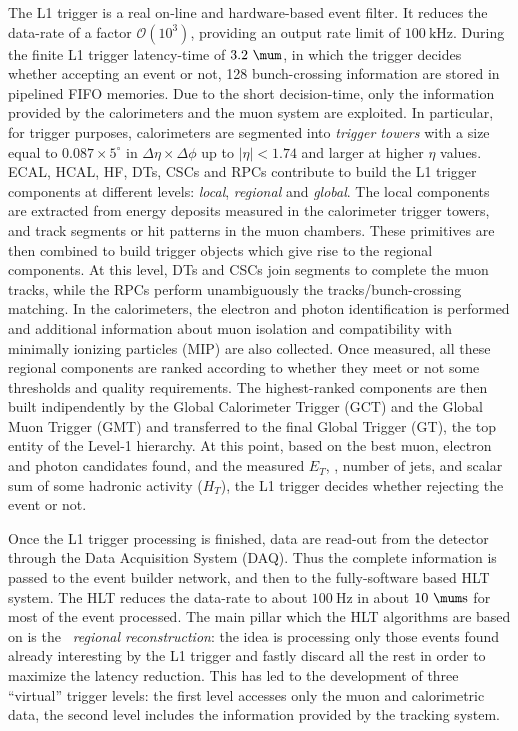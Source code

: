 The L1 trigger is a real on-line and hardware-based event filter. It reduces the data-rate of a factor $\mathcal{O}(10^3)$,
providing an output rate limit of $100~\si{\kilo\hertz}$. During the finite L1 trigger latency-time of $3.2~\si{\mum}$, 
in which the trigger decides whether accepting an event or not, 128 bunch-crossing information are stored in pipelined FIFO memories.
Due to the short decision-time, only the information provided by the calorimeters and the muon system are exploited.
In particular, for trigger purposes, calorimeters are segmented into \emph{trigger towers} with a size equal to
$0.087\times 5^\circ$ in $\Delta\eta\times\Delta\phi$ up to $|\eta|<1.74$ and larger at higher $\eta$ values.
ECAL, HCAL, HF, DTs, CSCs and RPCs contribute to build the L1 trigger components at different levels: \emph{local}, \emph{regional} and 
\emph{global}. The local components are extracted from energy deposits measured in the calorimeter trigger towers, 
and track segments or hit patterns in the muon chambers. These primitives are then combined to build
trigger objects which give rise to the regional components. At this level, DTs and CSCs join segments to complete 
the muon tracks, while the RPCs perform unambiguously the tracks/bunch-crossing matching. In the calorimeters, the electron
and photon identification is performed and additional information about muon isolation and compatibility with 
minimally ionizing particles (MIP) are also collected. Once measured, all these regional components are ranked according to 
whether they meet or not some thresholds and quality requirements. The highest-ranked components are then built indipendently by 
the Global Calorimeter Trigger (GCT) and the Global Muon Trigger (GMT) and transferred to the final Global Trigger (GT), 
the top entity of the Level-1 hierarchy. At this point, based on the best muon, electron and photon candidates found, 
and the measured $E_T$, \met, number of jets, and scalar sum of some hadronic activity ($H_T$), 
the L1 trigger decides whether rejecting the event or not. 

Once the L1 trigger processing is finished, data are read-out from the detector through the 
Data Acquisition System (DAQ). Thus the complete information is passed to the event builder network, and then to 
the fully-software based HLT system. The HLT reduces the data-rate to about $100~\si{\hertz}$ in about $10~\si{\mum\s}$
for most of the event processed. The main pillar which the HLT algorithms are based on is the ~\emph{regional reconstruction}:
the idea is processing only those events found already interesting by the L1 trigger and fastly discard all the rest in 
order to maximize the latency reduction. This has led to the development of three ``virtual'' trigger levels: the first level 
accesses only the muon and calorimetric data, the second level includes the information provided by the tracking system.

